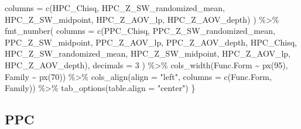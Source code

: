 \documentclass[
  english,
  letterpaper,
  DIV=11,
  numbers=noendperiod]{scrartcl}
\newenvironment{Shaded}{\begin{snugshade}}{\end{snugshade}}
\newcommand{\AttributeTok}[1]{\textcolor[rgb]{0.40,0.45,0.13}{#1}}
\newcommand{\DecValTok}[1]{\textcolor[rgb]{0.68,0.00,0.00}{#1}}
\newcommand{\FunctionTok}[1]{\textcolor[rgb]{0.28,0.35,0.67}{#1}}
\newcommand{\NormalTok}[1]{\textcolor[rgb]{0.00,0.23,0.31}{#1}}
\newcommand{\SpecialCharTok}[1]{\textcolor[rgb]{0.37,0.37,0.37}{#1}}
\newcommand{\StringTok}[1]{\textcolor[rgb]{0.13,0.47,0.30}{#1}}
\begin{document}
\begin{Shaded}
\begin{Highlighting}[]
      \AttributeTok{columns =} \FunctionTok{c}\NormalTok{(HPC\_Chisq, HPC\_Z\_SW\_randomized\_mean, HPC\_Z\_SW\_midpoint,}
\NormalTok{                  HPC\_Z\_AOV\_lp, HPC\_Z\_AOV\_depth)}
\NormalTok{    ) }\SpecialCharTok{\%\textgreater{}\%}
    \FunctionTok{fmt\_number}\NormalTok{(}
      \AttributeTok{columns =} \FunctionTok{c}\NormalTok{(PPC\_Chisq, PPC\_Z\_SW\_randomized\_mean, PPC\_Z\_SW\_midpoint,}
\NormalTok{                  PPC\_Z\_AOV\_lp, PPC\_Z\_AOV\_depth,}
\NormalTok{                  HPC\_Chisq, HPC\_Z\_SW\_randomized\_mean, HPC\_Z\_SW\_midpoint,}
\NormalTok{                  HPC\_Z\_AOV\_lp, HPC\_Z\_AOV\_depth),}
      \AttributeTok{decimals =} \DecValTok{3}
\NormalTok{    ) }\SpecialCharTok{\%\textgreater{}\%}
    \FunctionTok{cols\_width}\NormalTok{(Func.Form }\SpecialCharTok{\textasciitilde{}} \FunctionTok{px}\NormalTok{(}\DecValTok{95}\NormalTok{), Family }\SpecialCharTok{\textasciitilde{}} \FunctionTok{px}\NormalTok{(}\DecValTok{70}\NormalTok{)) }\SpecialCharTok{\%\textgreater{}\%}
    \FunctionTok{cols\_align}\NormalTok{(}\AttributeTok{align =} \StringTok{"left"}\NormalTok{, }\AttributeTok{columns =} \FunctionTok{c}\NormalTok{(Func.Form, Family)) }\SpecialCharTok{\%\textgreater{}\%}
    \FunctionTok{tab\_options}\NormalTok{(}\AttributeTok{table.align =} \StringTok{"center"}\NormalTok{)}
\NormalTok{\}}
\end{Highlighting}
\end{Shaded}

\subsection{PPC}\label{ppc}
\end{document}
